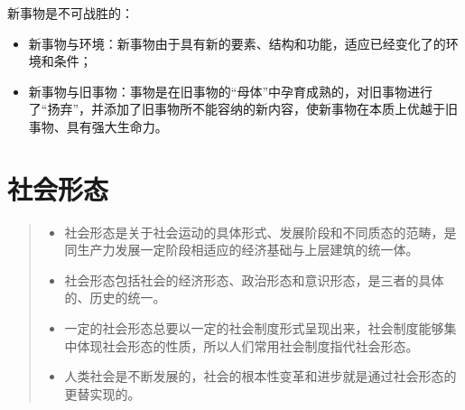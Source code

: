 \documentclass[
]{article}
\begin{document}
新事物是不可战胜的：

\begin{itemize}
\item
  新事物与环境：新事物由于具有新的要素、结构和功能，适应已经变化了的环境和条件；
\item
  新事物与旧事物：事物是在旧事物的``母体''中孕育成熟的，对旧事物进行了``扬弃''，并添加了旧事物所不能容纳的新内容，使新事物在本质上优越于旧事物、具有强大生命力。
\end{itemize}

\hypertarget{ux793eux4f1aux5f62ux6001}{%
\section{社会形态}\label{ux793eux4f1aux5f62ux6001}}

\begin{quote}
\begin{itemize}
\item
  社会形态是关于社会运动的具体形式、发展阶段和不同质态的范畴，是同生产力发展一定阶段相适应的经济基础与上层建筑的统一体。
\item
  社会形态包括社会的经济形态、政治形态和意识形态，是三者的具体的、历史的统一。
\item
  一定的社会形态总要以一定的社会制度形式呈现出来，社会制度能够集中体现社会形态的性质，所以人们常用社会制度指代社会形态。
\item
  人类社会是不断发展的，社会的根本性变革和进步就是通过社会形态的更替实现的。
\end{itemize}
\end{quote}
\end{document}
